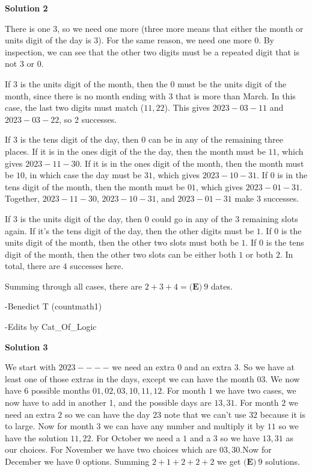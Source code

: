 \begin{enumerate}
\textbf{Solution 2}

There is one $3$, so we need one more (three more means that either the month or units digit of the day is $3$). For the same reason, we need one more $0$. By inspection, we can see that the other two digits must be a repeated digit that is not $3$ or $0$. 

 
If $3$ is the units digit of the month, then the $0$ must be the units digit of the month, since there is no month ending with 3 that is more than March. In this case, the last two digits must match ($11, 22$). This gives $2023-03-11$ and $2023-03-22$, so 2 successes.

 If $3$ is the tens digit of the day, then $0$ can be in any of the remaining three places. If it is in the ones digit of the the day, then the month must be $11$, which gives $2023-11-30$. If it is in the ones digit of the month, then the month must be $10$, in which case the day must be $31$, which gives $2023-10-31$. If $0$ is in the tens digit of the month, then the month must be $01$, which gives $2023-01-31$. Together, $2023-11-30$, $2023-10-31$, and $2023-01-31$ make 3 successes. 

 
If $3$ is the units digit of the day, then $0$ could go in any of the $3$ remaining slots again. If it's the tens digit of the day, then the other digits must be $1$. If $0$ is the units digit of the month, then the other two slots must both be $1$. If $0$ is the tens digit of the month, then the other two slots can be either both $1$ or both $2$. In total, there are $4$ successes here. 

 Summing through all cases, there are $2 + 3 + 4 = \boxed{\textbf{(E)}~9}$ dates. 

 -Benedict T (countmath1)

 -Edits by Cat\_Of\_Logic

 



\textbf{Solution 3}

We start with $2023----$ we need an extra $0$ and an extra $3$. So we have at least one of those extras in the days, except we can have the month $03$. We now have $6$ possible months $01,02,03,10,11,12$. For month $1$ we have two cases, we now have to add in another 1, and the possible days are $13,31$. For month $2$ we need an extra $2$ so we can have the day $23$ note that we can't use $32$ because it is to large. Now for month $3$ we can have any number and multiply it by $11$ so we have the solution $11,22$. For October we need a $1$ and a $3$ so we have $13,31$ as our choices. For November we have two choices which are $03,30$.Now for December we have $0$ options. Summing $2+1+2+2+2$ we get $\boxed{\textbf{(E)}~9}$ solutions.


\end{enumerate}
